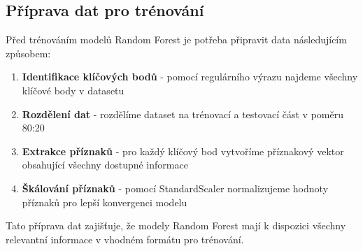 \subsection{Příprava dat pro trénování}

Před trénováním modelů Random Forest je potřeba připravit data následujícím způsobem:

\begin{enumerate}
    \item \textbf{Identifikace klíčových bodů} - pomocí regulárního výrazu najdeme všechny klíčové body v datasetu
    \item \textbf{Rozdělení dat} - rozdělíme dataset na trénovací a testovací část v poměru 80:20
    \item \textbf{Extrakce příznaků} - pro každý klíčový bod vytvoříme příznakový vektor obsahující všechny dostupné informace
    \item \textbf{Škálování příznaků} - pomocí StandardScaler normalizujeme hodnoty příznaků pro lepší konvergenci modelu
\end{enumerate}

Tato příprava dat zajišťuje, že modely Random Forest mají k dispozici všechny relevantní informace v vhodném formátu pro trénování. 